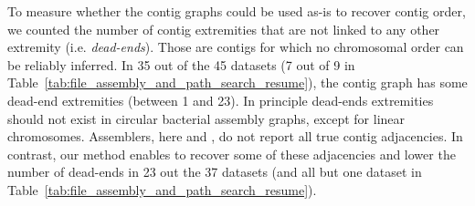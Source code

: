 \documentclass[./main.tex]{subfiles}
\newcommand{\modafterreview}[1]{#1}
\begin{document}
To measure whether the \canu contig graphs could be used as-is to \modafterreview{recover contig order}, we counted the number of contig extremities that are not linked to any other extremity (i.e. \emph{dead-ends}). Those are contigs for which no chromosomal order can be reliably inferred.
In 35 out of the 45 datasets (7 out of 9 in Table~\ref{tab:file_assembly_and_path_search_resume}), the \canu contig graph has some dead-end extremities (between 1 and 23). In principle dead-ends extremities should not exist in circular bacterial assembly graphs, except for linear chromosomes. \modafterreview{Assemblers, here \miniasm and} \canu, do not report all \modafterreview{true} contig adjacencies. \modafterreview{In contrast}, our method enables to recover some of these adjacencies and lower the number of dead-ends in \modafterreview{23 out the 37} datasets (and all but one \modafterreview{dataset} in Table~\ref{tab:file_assembly_and_path_search_resume}).

\end{document}
